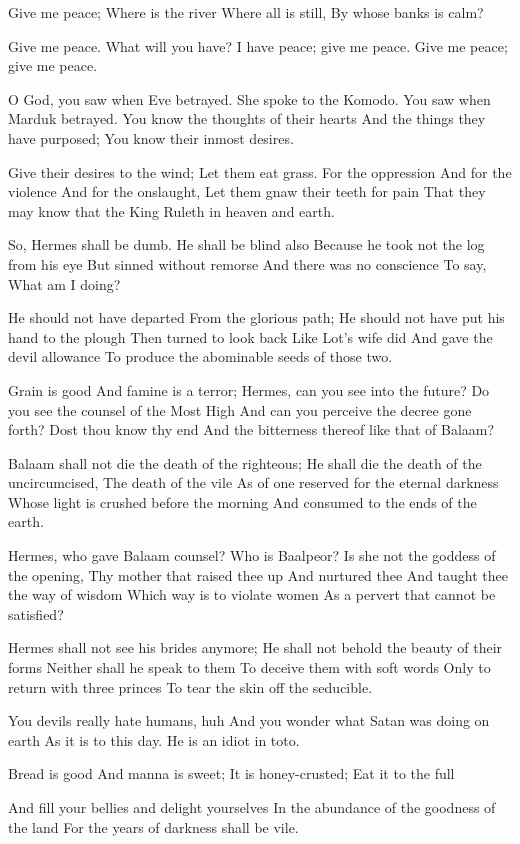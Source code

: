\documentclass[
]{book}
\begin{document}
Give me peace;
Where is the river
Where all is still,
By whose banks is calm?

Give me peace.
What will you have?
I have peace; give me peace.
Give me peace; give me peace.

O God, you saw when Eve betrayed.
She spoke to the Komodo.
You saw when Marduk betrayed.
You know the thoughts of their hearts
And the things they have purposed;
You know their inmost desires.

Give their desires to the wind;
Let them eat grass.
For the oppression
And for the violence
And for the onslaught,
Let them gnaw their teeth for pain
That they may know that the King
Ruleth in heaven and earth.

So, Hermes shall be dumb.
He shall be blind also
Because he took not the log from his eye
But sinned without remorse
And there was no conscience
To say, What am I doing?

He should not have departed
From the glorious path;
He should not have put his hand to the plough
Then turned to look back
Like Lot's wife did
And gave the devil allowance
To produce the abominable seeds of those two.

Grain is good
And famine is a terror;
Hermes, can you see into the future?
Do you see the counsel of the Most High
And can you perceive the decree gone forth?
Dost thou know thy end
And the bitterness thereof like that of Balaam?

Balaam shall not die the death of the righteous;
He shall die the death of the uncircumcised,
The death of the vile
As of one reserved for the eternal darkness
Whose light is crushed before the morning
And consumed to the ends of the earth.

Hermes, who gave Balaam counsel?
Who is Baalpeor?
Is she not the goddess of the opening,
Thy mother that raised thee up
And nurtured thee
And taught thee the way of wisdom
Which way is to violate women
As a pervert that cannot be satisfied?

Hermes shall not see his brides anymore;
He shall not behold the beauty of their forms
Neither shall he speak to them
To deceive them with soft words
Only to return with three princes
To tear the skin off the seducible.

You devils really hate humans, huh
And you wonder what Satan was doing on earth
As it is to this day.
He is an idiot in toto.

Bread is good
And manna is sweet;
It is honey-crusted;
Eat it to the full

And fill your bellies and delight yourselves
In the abundance of the goodness of the land
For the years of darkness shall be vile.
\end{document}
